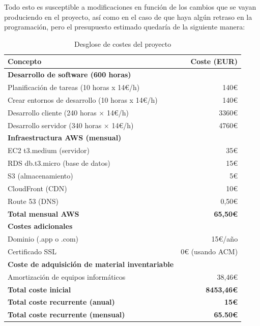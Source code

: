 Todo esto es susceptible a modificaciones en función de los cambios que se vayan produciendo en el proyecto, así como en el caso de que haya algún retraso en la programación, pero el presupuesto estimado quedaría de la siguiente manera:

\begin{table}[H]
	\centering
	\begin{tabular}{lr}
		\toprule
		\textbf{Concepto} & \textbf{Coste (EUR)} \\
		\midrule
		\textbf{Desarrollo de software (600 horas)} & \\
		\quad Planificación de tareas (10 horas x 14€/h) & 140€ \\
		\quad Crear entornos de desarrollo  (10 horas x 14€/h) & 140€ \\
		\quad Desarrollo cliente (240 horas × 14€/h) & 3360€ \\
		\quad Desarrollo servidor (340 horas × 14€/h) & 4760€ \\
		\midrule
		\textbf{Infraestructura AWS (mensual)} & \\
		\quad EC2 t3.medium (servidor) & 35€ \\
		\quad RDS db.t3.micro (base de datos) & 15€ \\
		\quad S3 (almacenamiento) & 5€ \\
		\quad CloudFront (CDN) & 10€ \\
		\quad Route 53 (DNS) & 0,50€ \\
		\quad \textbf{Total mensual AWS} & \textbf{65,50€} \\
		\midrule
		\textbf{Costes adicionales} & \\
		\quad Dominio (.app o .com) & 15€/año \\
		\quad Certificado SSL & 0€ (usando ACM) \\
		\midrule
		\textbf{Coste de adquisición de material inventariable} \\
		\quad Amortización de equipos informáticos & 38,46€ \\
		\midrule
		\textbf{Total coste inicial} & \textbf{8453,46€} \\
		\textbf{Total coste recurrente (anual)} & \textbf{15€} \\
		\textbf{Total coste recurrente (mensual)} & \textbf{65.50€} \\
		\bottomrule
	\end{tabular}
		\caption{Desglose de costes del proyecto}
\end{table}


